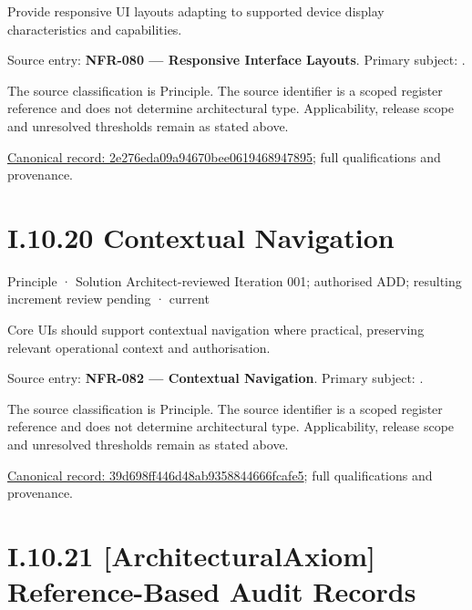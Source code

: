 Provide responsive UI layouts adapting to supported device display characteristics and capabilities.



Source entry: \textbf{NFR-080 — Responsive Interface Layouts}. Primary subject: \texttt{}.



The source classification is Principle. The source identifier is a scoped register reference and does not determine architectural type. Applicability, release scope and unresolved thresholds remain as stated above.


{\footnotesize \href{../../../../../../../../continuum/motivation/principle/2e276eda09a94670bee0619468947895.md}{Canonical record: 2e276eda09a94670bee0619468947895}; full qualifications and provenance.}\par
\section*{I.10.20 Contextual Navigation}
\label{navigation:I.10.20}

\label{element:39d698ff446d48ab9358844666fcafe5}
{\small Principle · Solution Architect-reviewed Iteration 001; authorised ADD; resulting increment review pending · current}\par

Core UIs should support contextual navigation where practical, preserving relevant operational context and authorisation.



Source entry: \textbf{NFR-082 — Contextual Navigation}. Primary subject: \texttt{}.



The source classification is Principle. The source identifier is a scoped register reference and does not determine architectural type. Applicability, release scope and unresolved thresholds remain as stated above.


{\footnotesize \href{../../../../../../../../continuum/motivation/principle/39d698ff446d48ab9358844666fcafe5.md}{Canonical record: 39d698ff446d48ab9358844666fcafe5}; full qualifications and provenance.}\par
\section*{I.10.21 [ArchitecturalAxiom] Reference-Based Audit Records}
\label{navigation:I.10.21}


